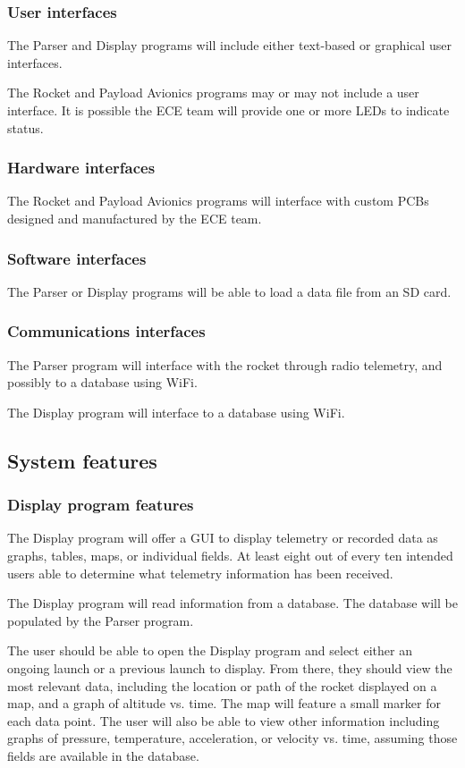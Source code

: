 \documentclass[onecolumn, draftclsnofoot, 10pt, compsoc]{IEEEtran}
\begin{document}
\subsubsection{User interfaces}
The Parser and Display programs will include either text-based or graphical user interfaces.

The Rocket and Payload Avionics programs may or may not include a user interface.  It is possible the ECE team will provide one or more LEDs to indicate status.

\subsubsection{Hardware interfaces}
The Rocket and Payload Avionics programs will interface with custom PCBs designed and manufactured by the ECE team.
	
\subsubsection{Software interfaces}
The Parser or Display programs will be able to load a data file from an SD card.

\subsubsection{Communications interfaces}
The Parser program will interface with the rocket through radio telemetry, and possibly to a database using WiFi.

The Display program will interface to a database using WiFi.

\subsection{System features}

\subsubsection{Display program features}
The Display program will offer a GUI to display telemetry or recorded data as graphs, tables, maps, or individual fields. At least eight out of every ten intended users able to determine what telemetry information has been received.

The Display program will read information from a database.  The database will be populated by the Parser program.

The user should be able to open the Display program and select either an ongoing launch or a previous launch to display. From there, they should view the most relevant data, including the location or path of the rocket displayed on a map, and a graph of altitude vs. time. The map will feature a small marker for each data point. The user will also be able to view other information including graphs of pressure, temperature, acceleration, or velocity vs. time, assuming those fields are available in the database.
\end{document}
